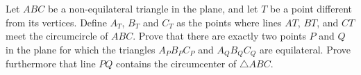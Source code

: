 Let $ABC$ be a non-equilateral triangle in the plane, and let $T$ be a point different from its vertices. Define $A_T$, $B_T$ and $C_T$ as the points where lines $AT$, $BT$, and $CT$ meet the circumcircle of $ABC$. Prove that there are exactly two points $P$ and $Q$ in the plane for which the triangles $A_PB_PC_P$ and $A_QB_QC_Q$ are equilateral. Prove furthermore that line $PQ$ contains the circumcenter of $\triangle ABC$.